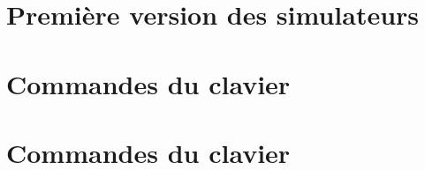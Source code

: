 %
%
\begin{appendix}
\chapter{Première version des simulateurs}


\newpage
\chapter{Commandes du clavier}


\newpage
\chapter{Commandes du clavier}


%
\end{appendix}
%
